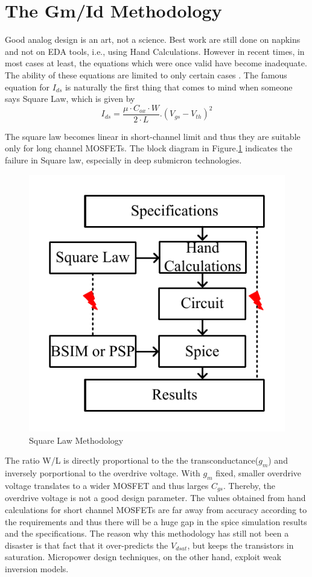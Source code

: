 \section{The Gm/Id Methodology}

Good analog design is an art, not a science. Best work are still done on napkins and not on EDA tools, i.e., using Hand Calculations. However in recent times, in most cases at least, the equations which were once valid have become inadequate. The ability of these equations are limited to only certain cases \cite{gmid_vs_sqlaw}. The famous equation for $I_{ds}$ is naturally the first thing that comes to mind when someone says Square Law, which is given by 
$$I_{ds} = \frac{\mu \cdot C_{ox}\cdot W}{2\cdot L}.(V_{gs}-V_{th})^2$$

The square law becomes linear in short-channel limit \cite{silveira1996g} and thus they are suitable only for long channel MOSFETs. The block diagram in Figure.\ref{fig:Square_Law} \cite{boris2017systematic} indicates the failure in Square law, especially in deep submicron technologies.

\begin{figure} [H]
\centering
\includegraphics[scale=1]{Figures/Misc/PDFs/Square_Law.pdf}
\caption{Square Law Methodology}
\label{fig:Square_Law}
\end{figure}

The ratio W/L is directly proportional to the the transconductance($g_m$) and inversely porportional to the overdrive voltage. With $g_m$ fixed, smaller overdrive voltage translates to a wider MOSFET and thus larges $C_{gs}$. Thereby, the overdrive voltage is not a good design parameter. The values obtained from hand calculations for short channel MOSFETs are far away from accuracy according to the requirements and thus there will be a huge gap in the spice simulation results and the specifications. The reason why this methodology has still not been a disaster is that fact that it over-predicts the $V_{dsat}$, but keeps the transistors in saturation. Micropower design techniques, on the other hand, exploit weak inversion models.

